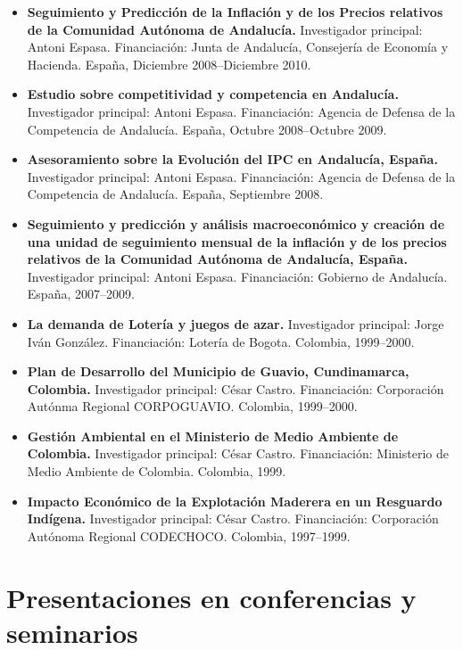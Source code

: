\documentclass[11pt]{article}\usepackage[]{graphicx}\usepackage[usenames,dvipsnames]{xcolor}
\begin{document}
\begin{itemize}
\item \textbf{Seguimiento y Predicción de la Inflación y de los Precios relativos de la Comunidad Autónoma de Andalucía.} Investigador principal: Antoni Espasa. Financiación: Junta de Andalucía, Consejería de Economía y Hacienda. España, Diciembre 2008--Diciembre 2010.

\item \textbf{Estudio sobre competitividad y competencia en Andalucía.} Investigador principal: Antoni Espasa. Financiación: Agencia de Defensa de la Competencia de Andalucía. España, Octubre 2008--Octubre 2009.

\item \textbf{Asesoramiento sobre la Evolución del IPC en Andalucía, España.} Investigador principal: Antoni Espasa. Financiación: Agencia de Defensa de la Competencia de Andalucía. España, Septiembre 2008.

\item \textbf{Seguimiento y predicción y análisis macroeconómico y creación de una unidad de seguimiento mensual de la inflación y de los precios relativos de la Comunidad Autónoma de Andalucía, España.} Investigador principal: Antoni Espasa. Financiación: Gobierno de Andalucía. España, 2007--2009.

\item \textbf{La demanda de Lotería y juegos de azar.} Investigador principal: Jorge Iván González. Financiación: Lotería de Bogota. Colombia, 1999--2000.

\item \textbf{Plan de Desarrollo del Municipio de Guavio, Cundinamarca, Colombia.} Investigador principal: César Castro. Financiación: Corporación Autónma Regional CORPOGUAVIO. Colombia, 1999--2000.

\item \textbf{Gestión Ambiental en el Ministerio de Medio Ambiente de Colombia.} Investigador principal: César Castro. Financiación: Ministerio de Medio Ambiente de Colombia. Colombia, 1999.

\item \textbf{Impacto Económico de la Explotación Maderera en un Resguardo Indígena.} Investigador principal: César Castro. Financiación: Corporación Autónoma Regional CODECHOCO. Colombia, 1997--1999.
\end{itemize}

\section{Presentaciones en conferencias y seminarios} 
\end{document}
